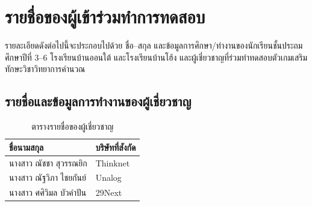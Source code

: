 \chapter{รายชื่อของผู้เข้าร่วมทำการทดสอบ}
รายละเอียดดังต่อไปนี้จะประกอบไปด้วย ชื่อ--สกุล และข้อมูลการศึกษา/ทำงานของนักเรียนชั้นประถมศึกษาปีที่ 3--6 โรงเรียนบ้านออนใต้ และโรงเรียนบ้านโฮ้ง และผู้เชี่ยวชาญที่ร่วมทำทดสอบตัวเกมเสริมทักษะวิชาวิทยาการคำนวณ
\section{รายชื่อและข้อมูลการทำงานของผู้เชี่ยวชาญ}
\begin{table}[h]
    \begin{center}
        \begin{tabular}{ |p{5cm}|p{5cm}| }
            \hline
            ชื่อนามสกุล & บริษัทที่สังกัด\\
            \hline
            นางสาว ณัชชา สุวรรณยิก & Thinknet\\
            \hline
            นางสาว ณัฐวิภา ไชยกันย์ & Unalog\\
            \hline
            นางสาว ศศิวิมล บัวคำปัน & 29Next\\
            \hline
        \end{tabular}
    \end{center}
    \caption[ตารางรายชื่อของผู้เชี่ยวชาญ]{ตารางรายชื่อของผู้เชี่ยวชาญ}
    \label{expertstable}
\end{table}

